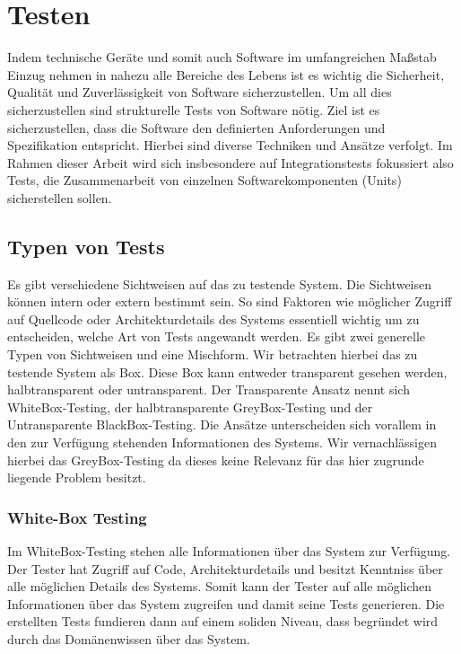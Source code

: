 \section{Testen}

Indem technische Geräte und somit auch Software im umfangreichen Maßstab Einzug nehmen in nahezu alle Bereiche des
Lebens ist es wichtig die Sicherheit, Qualität und Zuverlässigkeit von Software sicherzustellen.
Um all dies sicherzustellen sind strukturelle Tests von Software nötig.
Ziel ist es sicherzustellen, dass die Software den definierten Anforderungen und Spezifikation entspricht.
Hierbei sind diverse Techniken und Ansätze verfolgt.
Im Rahmen dieser Arbeit wird sich insbesondere auf Integrationstests fokussiert also Tests, die Zusammenarbeit von einzelnen Softwarekomponenten (Units)
sicherstellen sollen.

\subsection{Typen von Tests}

Es gibt verschiedene Sichtweisen auf das zu testende System.
Die Sichtweisen können intern oder extern bestimmt sein.
So sind Faktoren wie möglicher Zugriff auf Quellcode oder Architekturdetails des Systems essentiell wichtig um
zu entscheiden, welche Art von Tests angewandt werden.
Es gibt zwei generelle Typen von Sichtweisen und eine Mischform.
Wir betrachten hierbei das zu testende System als Box.
Diese Box kann entweder transparent gesehen werden, halbtransparent oder untransparent.
Der Transparente Ansatz nennt sich WhiteBox-Testing, der halbtransparente GreyBox-Testing und der Untransparente BlackBox-Testing.
Die Ansätze unterscheiden sich vorallem in den zur Verfügung stehenden Informationen des Systems.
Wir vernachlässigen hierbei das GreyBox-Testing da dieses keine Relevanz für das hier zugrunde liegende Problem besitzt.

\subsubsection{White-Box Testing}

Im WhiteBox-Testing stehen alle Informationen über das System zur Verfügung.
Der Tester hat Zugriff auf Code, Architekturdetails und besitzt Kenntniss über alle möglichen Details des Systems.
Somit kann der Tester auf alle möglichen Informationen über das System zugreifen und damit seine Tests generieren.
Die erstellten Tests fundieren dann auf einem soliden Niveau, dass begründet wird durch das Domänenwissen über das System.

